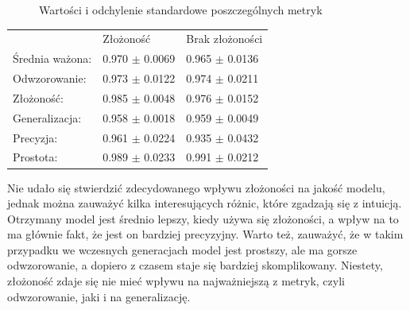 \begin{figure}[H]
	\caption{\label{fig:complexity-summary}Wartości i odchylenie standardowe poszczególnych metryk}
\end{figure}

 \begin{center}
  \begin{tabular}{lll}
  					& Złożoność & Brak złożoności \\
	Średnia ważona: & 0.970 $\pm$ 0.0069 & 0.965 $\pm$ 0.0136 \\ 
	Odwzorowanie: & 0.973 $\pm$ 0.0122 & 0.974 $\pm$ 0.0211 \\
	Złożoność: & 0.985 $\pm$ 0.0048 & 0.976 $\pm$ 0.0152 \\
	Generalizacja: & 0.958 $\pm$ 0.0018 & 0.959 $\pm$ 0.0049 \\
	Precyzja: & 0.961 $\pm$ 0.0224 & 0.935 $\pm$ 0.0432 \\
	Prostota: & 0.989 $\pm$ 0.0233 & 0.991 $\pm$ 0.0212
  \end{tabular}
 \end{center}

Nie udało się stwierdzić zdecydowanego wpływu złożoności na jakość modelu, jednak można zauważyć kilka interesujących różnic, które zgadzają się z intuicją. Otrzymany model jest średnio lepszy, kiedy używa się złożoności, a wpływ na to ma głównie fakt, że jest on bardziej precyzyjny. Warto też, zauważyć, że w takim przypadku we wczesnych generacjach model jest prostszy, ale ma gorsze odwzorowanie, a dopiero z czasem staje się bardziej skomplikowany. Niestety, złożoność zdaje się nie mieć wpływu na najważniejszą z metryk, czyli odwzorowanie, jaki i na generalizację. 

